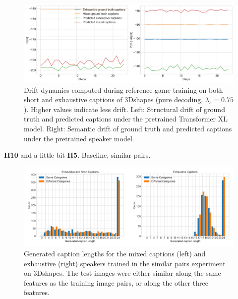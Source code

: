 \begin{figure}
	\centering
	\includegraphics[width=\linewidth]{images/3dshapes_exh_short_structural_semantic_drift_49_pure_075_similarFixed.png}
	\caption{Drift dynamics computed during reference game training on both short and exhaustive captions of 3Dshapes (pure decoding, $\lambda_s=0.75$). Higher values indicate less drift. Left: Structural drift of ground truth and predicted captions under the pretrained Transformer XL model. Right: Semantic drift of ground truth and predicted captions under the pretrained speaker model.}
	\label{fig:3dshapes_wShort_similarFixed_075_str_sem_drift}
\end{figure}

\textbf{H10} and a little bit \textbf{H5}.
Baseline, similar pairs.

\begin{figure}
	\centering
	\includegraphics[width=\linewidth]{images/3dshapes_exh_short_similar_sameTest_diffTest_length_counts.png}
	\caption{Generated caption lengths for the mixed captions (left) and exhaustive (right) speakers trained in the similar pairs experiment on 3Dshapes. The test images were either similar along the same features as the training image pairs, or along the other three features.}
	\label{fig:3dshapes_exh_short_same_diff_lengths}
\end{figure}


